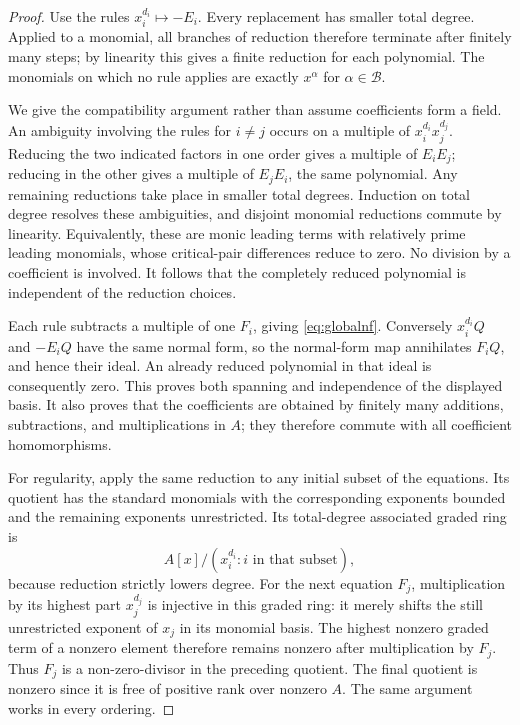 \documentclass[11pt,letterpaper,oneside]{article}
\numberwithin{equation}{section}
\theoremstyle{definition}
\theoremstyle{remark}\newtheorem{remark}[theorem]{Remark}
\begin{document}
\begin{proof}
Use the rules $x_i^{d_i}\mapsto-E_i$. Every replacement has smaller
total degree. Applied to a monomial, all branches of reduction therefore
terminate after finitely many steps; by linearity this gives a finite
reduction for each polynomial. The monomials on which no rule applies
are exactly $x^\alpha$ for $\alpha\in\mathcal B$.

We give the compatibility argument rather than assume coefficients form
a field. An ambiguity involving the rules for $i\ne j$ occurs on a
multiple of $x_i^{d_i}x_j^{d_j}$. Reducing the two indicated factors in
one order gives a multiple of $E_iE_j$; reducing in the other gives a
multiple of $E_jE_i$, the same polynomial. Any remaining reductions take
place in smaller total degrees. Induction on total degree resolves these
ambiguities, and disjoint monomial reductions commute by linearity.
Equivalently, these are monic leading terms with relatively prime leading
monomials, whose critical-pair differences reduce to zero. No division by
a coefficient is involved. It follows that the completely reduced
polynomial is independent of the reduction choices.

Each rule subtracts a multiple of one $F_i$, giving
\eqref{eq:globalnf}. Conversely $x_i^{d_i}Q$ and $-E_iQ$ have the same
normal form, so the normal-form map annihilates $F_iQ$, and hence their
ideal. An already reduced polynomial in that ideal is consequently zero.
This proves both spanning and independence of the displayed basis. It
also proves that the coefficients are obtained by finitely many additions,
subtractions, and multiplications in $A$; they therefore commute with
all coefficient homomorphisms.

For regularity, apply the same reduction to any initial subset of the
equations. Its quotient has the standard monomials with the corresponding
exponents bounded and the remaining exponents unrestricted. Its total-degree
associated graded ring is
\[
 A[x]/(x_i^{d_i}: i\text{ in that subset}),
\]
because reduction strictly lowers degree. For the next equation $F_j$,
multiplication by its highest part $x_j^{d_j}$ is injective in this graded
ring: it merely shifts the still unrestricted exponent of $x_j$ in its
monomial basis. The highest nonzero graded term of a nonzero element
therefore remains nonzero after multiplication by $F_j$. Thus $F_j$ is
a non-zero-divisor in the preceding quotient. The final quotient is
nonzero since it is free of positive rank over nonzero $A$. The same
argument works in every ordering.
\end{proof}
\end{document}
